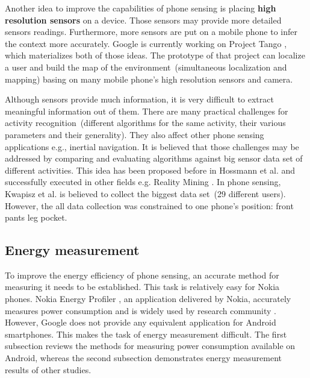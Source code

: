 Another idea to improve the capabilities of phone sensing is placing \textbf{high resolution sensors} on a device. Those sensors may provide more detailed sensors readings. Furthermore, more sensors are put on a mobile phone to infer the context more accurately. Google is currently working on Project Tango \cite{google:tango}, which materializes both of those ideas. The prototype of that project can localize a user and build the map of the environment\ (simultaneous localization and mapping) basing on many mobile phone's high resolution sensors and camera. 		
		
Although sensors provide much information, it is very difficult to extract meaningful information out of them. There are many practical challenges for activity recognition\ (different algorithms for the same activity, their various parameters and their generality). They also affect other phone sensing applications e.g., inertial navigation. It is believed that those challenges may be addressed by comparing and evaluating algorithms against big sensor data set of different activities. This idea has been proposed before in Hossmann et al.\cite{hossmann:bigdatasets} and successfully executed in other fields e.g. Reality Mining \cite{eagle:realitymining}. In phone sensing, Kwapisz et al. \cite{Kwapisz2011} is believed to collect the biggest data set\ (29 different users). However, the all data collection was constrained to one phone's position: front pants leg pocket. 
		
\subsection{Energy measurement}
\hspace{10pt} To improve the energy efficiency of phone sensing, an accurate method for measuring it needs to be established. This task is relatively easy for Nokia phones. Nokia Energy Profiler \cite{nokia:profiler}, an application delivered by Nokia,  accurately measures power consumption and is widely used by research community \cite{kjaergaard:entracked} \cite{lu:jigsaw} \cite{li:status}. However, Google does not provide any equivalent application for Android smartphones. This makes the task of energy measurement difficult. The first subsection reviews the methods for measuring power consumption available on Android, whereas the second subsection demonstrates energy measurement results of other studies.

